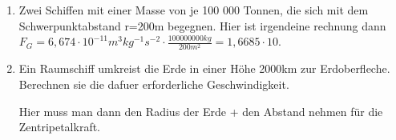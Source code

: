 \begin{enumerate}
    \item Zwei Schiffen mit einer Masse von je 100 000 Tonnen, die sich mit dem Schwerpunktabstand r=200m begegnen.
    Hier ist irgendeine rechnung dann $F_G=6,674\cdot
    10^{-11}m^3kg^{-1}s^{-2}\cdot \frac{100 000 000 kg}{200m^2} = 1,6685\cdot 10$.

    \item Ein Raumschiff umkreist die Erde in einer H\"ohe 2000km zur Erdoberfleche. Berechnen sie die dafuer erforderliche Geschwindigkeit.

        Hier muss man dann den Radius der Erde + den Abstand nehmen f\"ur die Zentripetalkraft.
\end{enumerate}


